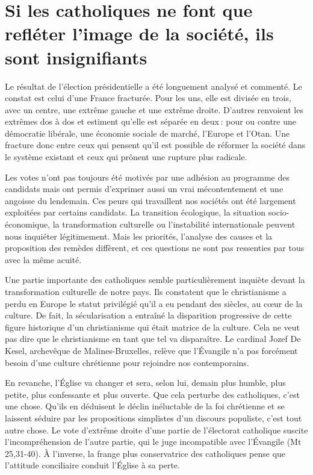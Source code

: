 \section{Si les catholiques ne font que refléter l’image de la société, ils sont insignifiants}


Le résultat de l’élection présidentielle a été longuement analysé et commenté. Le constat est celui d’une France fracturée. Pour les uns, elle est divisée en trois, avec un centre, une extrême gauche et une extrême droite. D’autres renvoient les extrêmes dos à dos et estiment qu’elle est séparée en deux : pour ou contre une démocratie libérale, une économie sociale de marché, l’Europe et l’Otan. Une fracture donc entre ceux qui pensent qu’il est possible de réformer la société dans le système existant et ceux qui prônent une rupture plus radicale.

Les votes n’ont pas toujours été motivés par une adhésion au programme des candidats mais ont permis d’exprimer aussi un vrai mécontentement et une angoisse du lendemain. Ces peurs qui travaillent nos sociétés ont été largement exploitées par certains candidats. La transition écologique, la situation socio-économique, la transformation culturelle ou l’instabilité internationale peuvent nous inquiéter légitimement. Mais les priorités, l’analyse des causes et la proposition des remèdes diffèrent, et ces questions ne sont pas ressenties par tous avec la même acuité.

Une partie importante des catholiques semble particulièrement inquiète devant la transformation culturelle de notre pays. Ils constatent que le christianisme a perdu en Europe le statut privilégié qu’il a eu pendant des siècles, au cœur de la culture. De fait, la sécularisation a entraîné la disparition progressive de cette figure historique d’un christianisme qui était matrice de la culture. Cela ne veut pas dire que le christianisme en tant que tel va disparaître. Le cardinal Jozef De Kesel, archevêque de Malines-Bruxelles, relève que l’Évangile n’a pas forcément besoin d’une culture chrétienne pour rejoindre nos contemporains.

En revanche, l’Église va changer et sera, selon lui, demain plus humble, plus petite, plus confessante et plus ouverte. Que cela perturbe des catholiques, c’est une chose. Qu’ils en déduisent le déclin inéluctable de la foi chrétienne et se laissent séduire par les propositions simplistes d’un discours populiste, c’est tout autre chose. Le vote d’extrême droite d’une partie de l’électorat catholique suscite l’incompréhension de l’autre partie, qui le juge incompatible avec l’Évangile (Mt 25,31-40). À l’inverse, la frange plus conservatrice des catholiques pense que l’attitude conciliaire conduit l’Église à sa perte.

